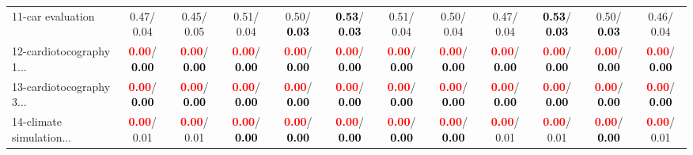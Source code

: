 \begin{table}[h]
\begin{center}
{\begin{tabular}{lc|c|c|c|c|c|c|c|c|c|c}
11-car evaluation &   0.47/  0.04 &   0.45/  0.05 &   0.51/  0.04 &   0.50/\textcolor{black}{\textbf{  0.03}} & \textcolor{black}{\textbf{  0.53}}/\textcolor{black}{\textbf{  0.03}} &   0.51/  0.04 &   0.50/  0.04 &   0.47/  0.04 & \textcolor{black}{\textbf{  0.53}}/\textcolor{black}{\textbf{  0.03}} &   0.50/\textcolor{black}{\textbf{  0.03}} &   0.46/  0.04 \\
12-cardiotocography 1... & \textcolor{red}{\textbf{  0.00}}/\textcolor{black}{\textbf{  0.00}} & \textcolor{red}{\textbf{  0.00}}/\textcolor{black}{\textbf{  0.00}} & \textcolor{red}{\textbf{  0.00}}/\textcolor{black}{\textbf{  0.00}} & \textcolor{red}{\textbf{  0.00}}/\textcolor{black}{\textbf{  0.00}} & \textcolor{red}{\textbf{  0.00}}/\textcolor{black}{\textbf{  0.00}} & \textcolor{red}{\textbf{  0.00}}/\textcolor{black}{\textbf{  0.00}} & \textcolor{red}{\textbf{  0.00}}/\textcolor{black}{\textbf{  0.00}} & \textcolor{red}{\textbf{  0.00}}/\textcolor{black}{\textbf{  0.00}} & \textcolor{red}{\textbf{  0.00}}/\textcolor{black}{\textbf{  0.00}} & \textcolor{red}{\textbf{  0.00}}/\textcolor{black}{\textbf{  0.00}} & \textcolor{red}{\textbf{  0.00}}/\textcolor{black}{\textbf{  0.00}} \\
13-cardiotocography 3... & \textcolor{red}{\textbf{  0.00}}/\textcolor{black}{\textbf{  0.00}} & \textcolor{red}{\textbf{  0.00}}/\textcolor{black}{\textbf{  0.00}} & \textcolor{red}{\textbf{  0.00}}/\textcolor{black}{\textbf{  0.00}} & \textcolor{red}{\textbf{  0.00}}/\textcolor{black}{\textbf{  0.00}} & \textcolor{red}{\textbf{  0.00}}/\textcolor{black}{\textbf{  0.00}} & \textcolor{red}{\textbf{  0.00}}/\textcolor{black}{\textbf{  0.00}} & \textcolor{red}{\textbf{  0.00}}/\textcolor{black}{\textbf{  0.00}} & \textcolor{red}{\textbf{  0.00}}/\textcolor{black}{\textbf{  0.00}} & \textcolor{red}{\textbf{  0.00}}/\textcolor{black}{\textbf{  0.00}} & \textcolor{red}{\textbf{  0.00}}/\textcolor{black}{\textbf{  0.00}} & \textcolor{red}{\textbf{  0.00}}/\textcolor{black}{\textbf{  0.00}} \\
14-climate simulation... & \textcolor{red}{\textbf{  0.00}}/  0.01 & \textcolor{red}{\textbf{  0.00}}/  0.01 & \textcolor{red}{\textbf{  0.00}}/\textcolor{black}{\textbf{  0.00}} & \textcolor{red}{\textbf{  0.00}}/\textcolor{black}{\textbf{  0.00}} & \textcolor{red}{\textbf{  0.00}}/\textcolor{black}{\textbf{  0.00}} & \textcolor{red}{\textbf{  0.00}}/\textcolor{black}{\textbf{  0.00}} & \textcolor{red}{\textbf{  0.00}}/\textcolor{black}{\textbf{  0.00}} & \textcolor{red}{\textbf{  0.00}}/  0.01 & \textcolor{red}{\textbf{  0.00}}/  0.01 & \textcolor{red}{\textbf{  0.00}}/\textcolor{black}{\textbf{  0.00}} & \textcolor{red}{\textbf{  0.00}}/  0.01 \\ \hline

\end{tabular}}
\end{center}
\end{table}
